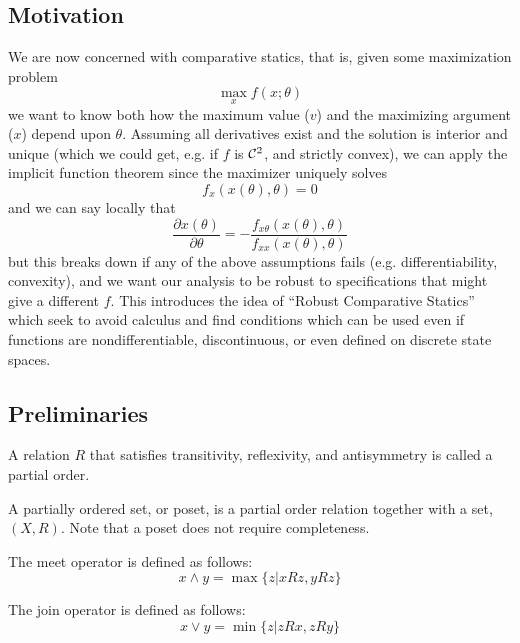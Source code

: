 

\subsection{Motivation}
\label{sec:motivation}

We are now concerned with comparative statics, that is, given some
maximization problem
\[
\max_{x} f(x; \theta)
\]
we want to know both how the maximum value ($v$) and the maximizing
argument ($x$) depend upon $\theta$. Assuming all derivatives exist
and the solution is interior and unique (which we could get, e.g. if
$f$ is ${\cal C}^2$, and strictly convex), we can apply the implicit
function theorem since the maximizer uniquely solves
\[
f_x(x(\theta), \theta) = 0
\]
and we can say locally that
\[
\frac{\partial x(\theta)}{\partial \theta}
= - \frac{f_{x\theta}(x(\theta), \theta)}{f_{xx}(x(\theta),\theta)}
\]
but this breaks down if any of the above assumptions fails
(e.g. differentiability, convexity), and we want our analysis to be
robust to specifications that might give a different $f$. This
introduces the idea of ``Robust Comparative Statics'' which seek to
avoid calculus and find conditions which can be used even if functions
are nondifferentiable, discontinuous, or even defined on discrete
state spaces.

\subsection{Preliminaries}
\label{sec:preliminaries}

\begin{definition}
  A relation $R$ that satisfies transitivity, reflexivity, and
  antisymmetry is called a partial order.
\end{definition}

\begin{definition}
  A partially ordered set, or poset, is a partial order relation
  together with a set, $(X, R)$. Note that a poset does not require
  completeness.
\end{definition}

\begin{definition}[Meet]
  The meet operator is defined as follows:
  \[
  x \wedge y = \max\{z | xRz, yRz\}
  \]
\end{definition}

\begin{definition}[Join]
  The join operator is defined as follows:
  \[
  x \vee y = \min\{z | zRx, zRy\}
  \]
\end{definition}

